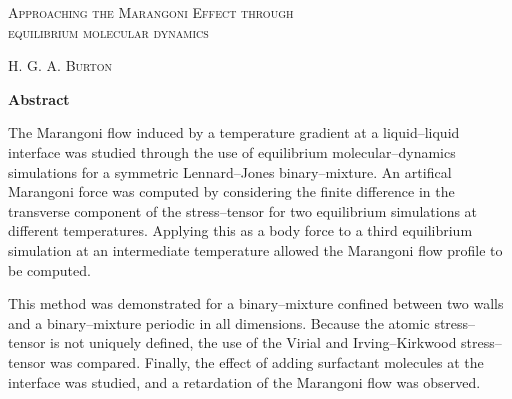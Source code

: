 \thispagestyle{plain}
\begin{center}
\textsc{\Large Approaching the Marangoni Effect through\\ equilibrium molecular dynamics}

    \vspace{0.2cm}
    \normalsize{{\textsc{H. G. A. Burton}}}
    
\vspace{0.2cm}
    \normalsize{\textbf{Abstract}}
\end{center}
The Marangoni flow induced by a temperature gradient at a liquid--liquid interface was studied through the use of equilibrium molecular--dynamics simulations for a symmetric Lennard--Jones binary--mixture.
An artifical Marangoni force was computed by considering the finite difference in the transverse component of the stress--tensor for two equilibrium simulations at different temperatures.
Applying this as a body force to a third equilibrium simulation at an intermediate temperature allowed the Marangoni flow profile to be computed.

This method was demonstrated for a binary--mixture confined between two walls and a binary--mixture periodic in all dimensions. Because the atomic stress--tensor is not uniquely defined, the use of the Virial and Irving--Kirkwood stress--tensor was compared.
Finally, the effect of adding surfactant molecules at the interface was studied, and a retardation of the Marangoni flow was observed.
